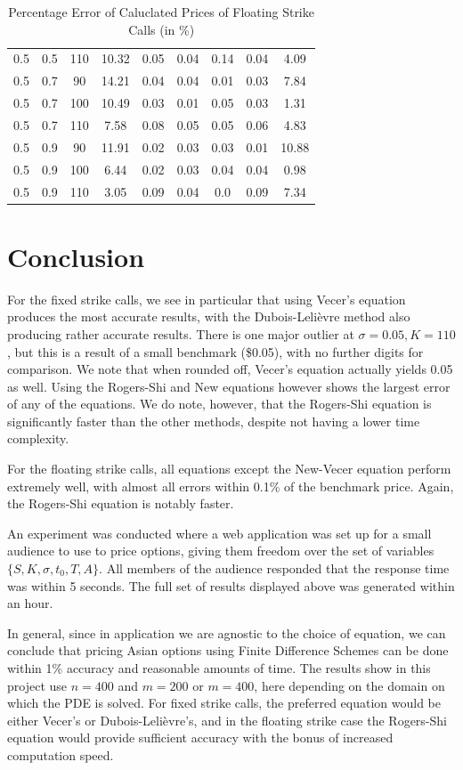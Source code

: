 \documentclass[12pt]{report}
\begin{document}
\begin{table}[H]
\begin{tabular}{|c|c|c|c|c|c|c|c|c|}
  0.5 & 0.5 & 110 & 10.32 & 0.05 & 0.04 & 0.14 & 0.04 & 4.09 \\
  0.5 & 0.7 & 90 & 14.21 & 0.04 & 0.04 & 0.01 & 0.03 & 7.84 \\
  0.5 & 0.7 & 100 & 10.49 & 0.03 & 0.01 & 0.05 & 0.03 & 1.31 \\
  0.5 & 0.7 & 110 & 7.58 & 0.08 & 0.05 & 0.05 & 0.06 & 4.83 \\
  0.5 & 0.9 & 90 & 11.91 & 0.02 & 0.03 & 0.03 & 0.01 & 10.88 \\
  0.5 & 0.9 & 100 & 6.44 & 0.02 & 0.03 & 0.04 & 0.04 & 0.98 \\
  0.5 & 0.9 & 110 & 3.05 & 0.09 & 0.04 & 0.0 & 0.09 & 7.34 \\
  \hline
  \end{tabular}
  \caption{Percentage Error of Caluclated Prices of Floating Strike Calls (in \%)}
  \label{table:name}
\end{table}
\normalsize

\chapter{Conclusion}
For the fixed strike calls, we see in particular that using Vecer's equation produces the most accurate results, with the Dubois-Leli\`evre method also producing rather accurate results. There is one major outlier at \(\sigma=0.05, K=110\), but this is a result of a small benchmark (\$0.05), with no further digits for comparison. We note that when rounded off, Vecer's equation actually yields 0.05 as well. Using the Rogers-Shi and New equations however shows the largest error of any of the equations. We do note, however, that the Rogers-Shi equation is significantly faster than the other methods, despite not having a lower time complexity.

For the floating strike calls, all equations except the New-Vecer equation perform extremely well, with almost all errors within 0.1\% of the benchmark price. Again, the Rogers-Shi equation is notably faster.

An experiment was conducted where a web application was set up for a small audience to use to price options, giving them freedom over the set of variables \(\{S, K, \sigma, t_0, T, A\}\). All members of the audience responded that the response time was within 5 seconds. The full set of results displayed above was generated within an hour.

In general, since in application we are agnostic to the choice of equation, we can conclude that pricing Asian options using Finite Difference Schemes can be done within 1\% accuracy and reasonable amounts of time. The results show in this project use \(n=400\) and \(m = 200\) or \(m=400\), here depending on the domain on which the PDE is solved. For fixed strike calls, the preferred equation would be either Vecer's or Dubois-Leli\`evre's, and in the floating strike case the Rogers-Shi equation would provide sufficient accuracy with the bonus of increased computation speed.
\end{document}
